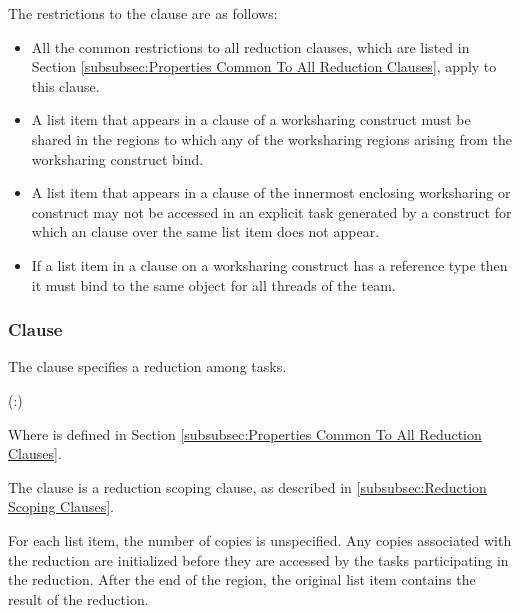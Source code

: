 {{{{\restrictions
The restrictions to the  clause are as follows:

\begin{itemize}
\item All the common restrictions to all reduction clauses, which are listed in
Section \ref{subsubsec:Properties Common To All Reduction Clauses}, apply to
this clause.

\item A list item that appears in a  clause of a worksharing
construct must be shared in the  regions to which any of the
worksharing regions arising from the worksharing construct bind.

\item A list item that appears in a  clause of the innermost
enclosing worksharing or  construct may not be accessed in an
explicit task generated by a construct for which an  clause
over the same list item does not appear.

\ccppspecificstart
\item If a list item in a  clause on a worksharing
construct has a reference type then it must bind to the same object for all threads of the team.
\ccppspecificend
\end{itemize}










\subsubsection{ Clause}
\label{subsubsec:task_reduction clause}
\summary
The  clause specifies a reduction among tasks.

\syntax
\begin{boxedcode}
(:)
\end{boxedcode}
Where  is defined in Section
\ref{subsubsec:Properties Common To All Reduction Clauses}.

\descr
The  clause is a reduction scoping clause, as described in
\ref{subsubsec:Reduction Scoping Clauses}.

For each list item, the number of copies is unspecified. Any copies associated
with the reduction are initialized before they are accessed by the tasks
participating in the reduction. After the end of the region, the original list
item contains the result of the reduction.

}}}}
